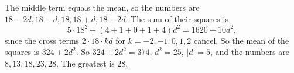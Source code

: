 The middle term equals the mean, so the numbers are $18-2d,18-d,18,18+d,18+2d$. The sum of their squares is
\[
5\cdot18^2+(4+1+0+1+4)d^2=1620+10d^2,
\]
since the cross terms $2\cdot18\cdot kd$ for $k=-2,-1,0,1,2$ cancel. So the mean of the squares is $324+2d^2$. So $324+2d^2=374$, $d^2=25$, $|d|=5$, and the numbers are $8,13,18,23,28$. The greatest is $\boxed{28}$.
